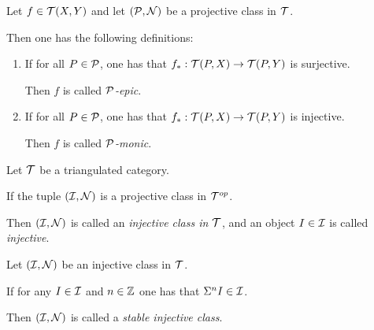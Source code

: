 
\begin{definition}
    Let \( f \in {\mathcal{T}}(X, Y) \) and let \( ({\mathcal{P}}, {\mathcal{N}}) \) be a projective class in \( {\mathcal{T}} \).

    Then one has the following definitions:

    \begin{enumerate}
        \item {If for all \( P \in {\mathcal{P}} \), one has that \( f_*: {\mathcal{T}}(P, X) \to {\mathcal{T}}(P, Y) \) is surjective.
        
        Then \( f \) is called \emph{\( {\mathcal{P}} \)-epic}.}
        
        \item {If for all \( P \in {\mathcal{P}} \), one has that \( f_*: {\mathcal{T}}(P, X) \to {\mathcal{T}}(P, Y) \) is injective.
        
        Then \( f \) is called \emph{\( {\mathcal{P}} \)-monic}.}
    \end{enumerate}
\end{definition}


\begin{definition}
    Let \( {\mathcal{T}} \) be a triangulated category.

    If the tuple \( ({\mathcal{I}}, {\mathcal{N}}) \) is a projective class in \( {\mathcal{T}}^{op} \).
    
    Then \( ({\mathcal{I}}, {\mathcal{N}}) \) is called an \emph{injective class in \( {\mathcal{T}} \)}, and an object \( I \in {\mathcal{I}} \) is called \emph{injective}.
\end{definition}



\begin{definition}
    Let \( ({\mathcal{I}}, {\mathcal{N}}) \) be an injective class in \( {\mathcal{T}} \).

    If for any \( I \in {\mathcal{I}} \) and \( n \in {\mathbb{Z}} \) one has that \( \Sigma^n I \in {\mathcal{I}} \).
    
    Then \( ({\mathcal{I}}, {\mathcal{N}}) \) is called a \emph{stable injective class}.
\end{definition}

